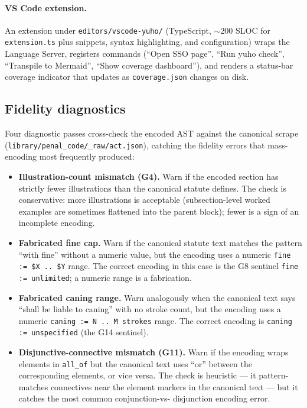 \paragraph{VS Code extension.} An extension under
\texttt{editors/vscode-yuho/} (TypeScript, $\sim$200 SLOC for
\texttt{extension.ts} plus snippets, syntax highlighting, and
configuration) wraps the Language Server, registers commands
(``Open SSO page'', ``Run yuho check'', ``Transpile to Mermaid'',
``Show coverage dashboard''), and renders a status-bar coverage indicator
that updates as \texttt{coverage.json} changes on disk.

\subsection{Fidelity diagnostics}
\label{subsec:fidelity}
Four diagnostic passes cross-check the encoded AST against the canonical
scrape (\texttt{library/penal\_code/\_raw/act.json}), catching the
fidelity errors that mass-encoding most frequently produced:

\begin{itemize}
\item \textbf{Illustration-count mismatch (\textsf{G4}).} Warn if the
encoded section has strictly fewer illustrations than the canonical
statute defines. The check is conservative: more illustrations is
acceptable (subsection-level worked examples are sometimes flattened
into the parent block); fewer is a sign of an incomplete encoding.
\item \textbf{Fabricated fine cap.} Warn if the canonical statute text
matches the pattern ``with fine'' without a numeric value, but the
encoding uses a numeric \texttt{fine := \$X .. \$Y} range. The correct
encoding in this case is the \textsf{G8} sentinel \texttt{fine :=
unlimited}; a numeric range is a fabrication.
\item \textbf{Fabricated caning range.} Warn analogously when the
canonical text says ``shall be liable to caning'' with no stroke count,
but the encoding uses a numeric \texttt{caning := N .. M strokes} range.
The correct encoding is \texttt{caning := unspecified} (the \textsf{G14}
sentinel).
\item \textbf{Disjunctive-connective mismatch (\textsf{G11}).} Warn if
the encoding wraps elements in \texttt{all\_of} but the canonical text
uses ``or'' between the corresponding elements, or vice versa. The check
is heuristic --- it pattern-matches connectives near the element markers
in the canonical text --- but it catches the most common conjunction-vs-
disjunction encoding error.
\end{itemize}

